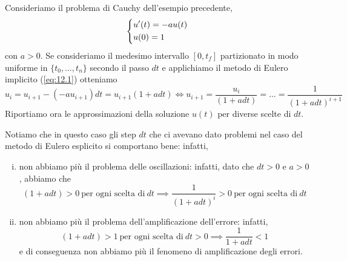 \begin{example}
    Consideriamo il problema di Cauchy dell'esempio precedente,
    \[
    \begin{dcases}
        u'(t) = -au(t)\\
        u(0) = 1
    \end{dcases}
    \]
    con $a>0$. Se consideriamo il medesimo intervallo $[0, t_f]$ partizionato in modo uniforme in $\{t_0, \dots, t_n\}$ secondo il passo $dt$ e applichiamo il metodo di Eulero implicito (\ref{eq:12.1}) otteniamo
    \[
    u_{i} = u_{i+1}-(-au_{i+1})dt = u_{i+1}\left(1+adt\right) \iff u_{i+1} = \frac{u_i}{(1+adt)} = \dots = \frac{1}{(1+adt)^{i+1}} 
    \]
    Riportiamo ora le approssimazioni della soluzione $u(t)$ per diverse scelte di $dt$.
    \begin{center}
    \end{center}
    Notiamo che in questo caso gli step $dt$ che ci avevano dato problemi nel caso del metodo di Eulero esplicito si comportano bene: infatti,
    \begin{enumerate}[(i)]
        \item non abbiamo più il problema delle oscillazioni: infatti, dato che $dt>0$ e $a>0$, abbiamo che
        \[
        (1+adt)>0 \ \text{per ogni scelta di} \ dt \implies \frac{1}{(1+adt)^i}>0 \ \text{per ogni scelta di} \ dt
        \]
        \item non abbiamo più il problema dell'amplificazione dell'errore: infatti,
        \[
        (1+adt)>1 \ \text{per ogni scelta di} \ dt>0 \implies \frac{1}{1+adt}<1 
        \]
        e di conseguenza non abbiamo più il fenomeno di amplificazione degli errori.
    \end{enumerate}
\end{example}
